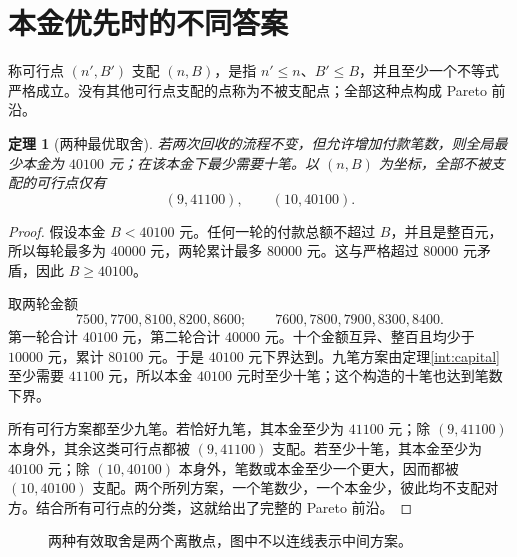 \documentclass[UTF8,a4paper]{ctexbook}
\newtheorem{theorem}{定理}[chapter]
\theoremstyle{definition}
\numberwithin{equation}{chapter}
\newcommand{\1}{\mathbf{1}}
\begin{document}
\section{本金优先时的不同答案}
称可行点 $(n',B')$ 支配 $(n,B)$，是指 $n'\le n$、$B'\le B$，并且至少一个不等式严格成立。没有其他可行点支配的点称为不被支配点；全部这种点构成 Pareto 前沿。
\begin{theorem}[两种最优取舍]\label{int:pareto}
若两次回收的流程不变，但允许增加付款笔数，则全局最少本金为 $40100$ 元；在该本金下最少需要十笔。以 $(n,B)$ 为坐标，全部不被支配的可行点仅有
\[
(9,41100),\qquad (10,40100).
\]
\end{theorem}
\begin{proof}
假设本金 $B<40100$ 元。任何一轮的付款总额不超过 $B$，并且是整百元，所以每轮最多为 $40000$ 元，两轮累计最多 $80000$ 元。这与严格超过 $80000$ 元矛盾，因此 $B\ge40100$。

取两轮金额
\[
7500,7700,8100,8200,8600;
\qquad
7600,7800,7900,8300,8400.
\]
第一轮合计 $40100$ 元，第二轮合计 $40000$ 元。十个金额互异、整百且均少于 $10000$ 元，累计 $80100$ 元。于是 $40100$ 元下界达到。九笔方案由定理\ref{int:capital}至少需要 $41100$ 元，所以本金 $40100$ 元时至少十笔；这个构造的十笔也达到笔数下界。

所有可行方案都至少九笔。若恰好九笔，其本金至少为 $41100$ 元；除 $(9,41100)$ 本身外，其余这类可行点都被 $(9,41100)$ 支配。若至少十笔，其本金至少为 $40100$ 元；除 $(10,40100)$ 本身外，笔数或本金至少一个更大，因而都被 $(10,40100)$ 支配。两个所列方案，一个笔数少，一个本金少，彼此均不支配对方。结合所有可行点的分类，这就给出了完整的 Pareto 前沿。
\end{proof}

\begin{figure}[htbp]
\centering
{}
\caption{两种有效取舍是两个离散点，图中不以连线表示中间方案。}
\label{int:pareto-figure}
\end{figure}
\end{document}
